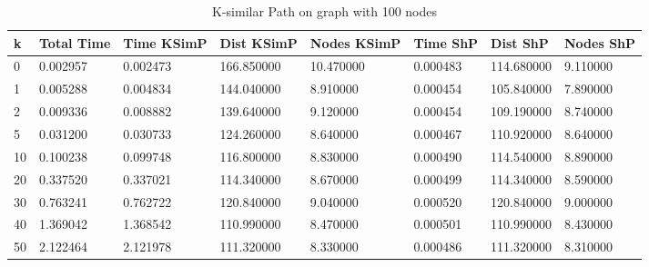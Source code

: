 \documentclass[]{article}
\numberwithin{equation}{section}
\begin{document}
\begin{appendices}
\begin{table}[H]
	\centering
	\small
	\setlength\tabcolsep{2pt}
	\begin{tabular}{|l|l|l|l|l|l|l|l|}
		\hline
		k  & Total Time & Time KSimP & Dist KSimP & Nodes KSimP & Time ShP & Dist ShP   & Nodes ShP \\ \hline
		0  & 0.002957   & 0.002473   & 166.850000 & 10.470000   & 0.000483 & 114.680000 & 9.110000  \\ \hline
		1  & 0.005288   & 0.004834   & 144.040000 & 8.910000    & 0.000454 & 105.840000 & 7.890000  \\ \hline
		2  & 0.009336   & 0.008882   & 139.640000 & 9.120000    & 0.000454 & 109.190000 & 8.740000  \\ \hline
		5  & 0.031200   & 0.030733   & 124.260000 & 8.640000    & 0.000467 & 110.920000 & 8.640000  \\ \hline
		10 & 0.100238   & 0.099748   & 116.800000 & 8.830000    & 0.000490 & 114.540000 & 8.890000  \\ \hline
		20 & 0.337520   & 0.337021   & 114.340000 & 8.670000    & 0.000499 & 114.340000 & 8.590000  \\ \hline
		30 & 0.763241   & 0.762722   & 120.840000 & 9.040000    & 0.000520 & 120.840000 & 9.000000  \\ \hline
		40 & 1.369042   & 1.368542   & 110.990000 & 8.470000    & 0.000501 & 110.990000 & 8.430000  \\ \hline
		50 & 2.122464   & 2.121978   & 111.320000 & 8.330000    & 0.000486 & 111.320000 & 8.310000  \\ \hline
	\end{tabular}
	\caption{K-similar Path on graph with 100 nodes}
\end{table}


\end{appendices}
\end{document}
